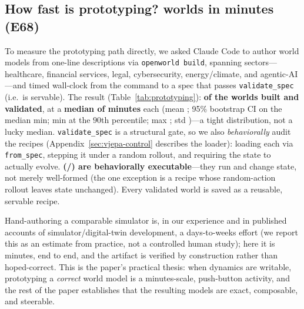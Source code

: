 \documentclass[11pt]{article}
\begin{document}
\subsection{How fast is prototyping? \ProtoNumWorlds{} worlds in minutes (E68)}\label{sec:proto-latency}
To measure the prototyping path directly, we asked Claude Code to author \ProtoNumWorlds{}
world models from one-line descriptions via \texttt{openworld build}, spanning
\ProtoNumSectors{} sectors---healthcare, financial services, legal, cybersecurity,
energy/climate, and agentic-AI---and timed wall-clock from the command to a spec that
passes \texttt{validate\_spec} (i.e.\ is servable). The result (Table~\ref{tab:prototyping}):
\textbf{\ProtoValidationRate{} of the \ProtoNumWorlds{} worlds built and validated},
at a \textbf{median of \ProtoMedianMinutes{} minutes} each (mean \ProtoMeanMinutes;
95\% bootstrap CI on the median \ProtoMedianCI{} min; \ProtoPNinetyMinutes{} min at the
$90$th percentile; max \ProtoMaxMinutes; std \ProtoStdMinutes)---a tight distribution, not
a lucky median. \texttt{validate\_spec} is a structural gate, so we also \emph{behaviorally}
audit the recipes (Appendix~\ref{sec:vjepa-control} describes the loader): loading each via
\texttt{from\_spec}, stepping it under a random rollout, and requiring the state to actually
evolve. \textbf{\ProtoExecutableRate{} (\ProtoNExecutable/\ProtoNumWorlds) are behaviorally
executable}---they run and change state, not merely well-formed (the one exception is a
recipe whose random-action rollout leaves state unchanged). Every validated world is saved
as a reusable, servable recipe.

Hand-authoring a comparable simulator is, in our experience and in published accounts of
simulator/digital-twin development, a days-to-weeks effort (we report this as an estimate
from practice, not a controlled human study); here it is minutes, end to end, and the
artifact is verified by construction rather than hoped-correct. This is the paper's
practical thesis: when dynamics are writable, prototyping a \emph{correct} world model is a
minutes-scale, push-button activity, and the rest of the paper establishes that the
resulting models are exact, composable, and steerable.

\begin{table}[htb]\centering\small

\caption{\textbf{Prototyping-latency benchmark (E68/E68b).} \ProtoNumWorlds{} world models
across \ProtoNumSectors{} sectors, each authored by Claude Code (\texttt{openworld
build}) and timed; all saved as recipes. Two gates of increasing strictness:
\emph{Validated} counts worlds passing the structural \texttt{validate\_spec} gate
(well-formed, round-tripping, servable; \ProtoValidationRate); \emph{Executable} counts
those that also evolve state under a random rollout in the behavioral audit
(\ProtoExecutableRate; the one exception is a recipe whose random-action rollout leaves
state unchanged). Wall-clock varies run-to-run (LLM latency), so this reproduces in
distribution (minutes-scale). Per-world characteristics: Figure~\ref{fig:world-atlas}.}
\label{tab:prototyping}
\end{table}
\end{document}
